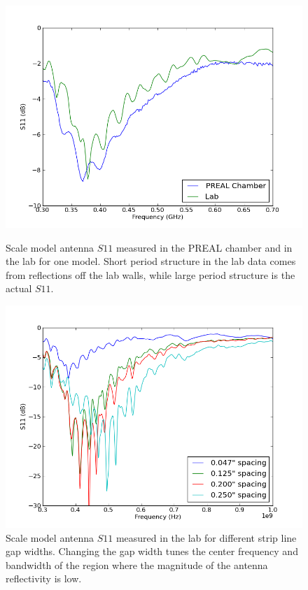 \begin{figure}[htb]
\centering
\begin{minipage}[b]{0.47\textwidth}
\centering
\includegraphics[width=0.95\linewidth]{SCIHI_system/figures/HIbiscus_S11_model_dB_PREAL.png}
\caption{Scale model antenna $S11$ measured in the PREAL chamber and in the lab for one model. Short period structure in the lab data comes from reflections off the lab walls, while large period structure is the actual $S11$.  }
\label{Fig:HIS11_model_dB}
\end{minipage}%
\begin{minipage}[b]{0.02\textwidth}
\hspace{1cm}
\end{minipage}%
\begin{minipage}[b]{0.47\textwidth}
\centering
\includegraphics[width=0.95\linewidth]{SCIHI_system/figures/HIbiscus_S11_model_spacing_dB.png}
\caption{Scale model antenna $S11$ measured in the lab for different strip line gap widths. Changing the gap width tunes the center frequency and bandwidth of the region where the magnitude of the antenna reflectivity is low.  }
\label{Fig:HIS11_model_inc_dB}
\end{minipage}
\end{figure}

